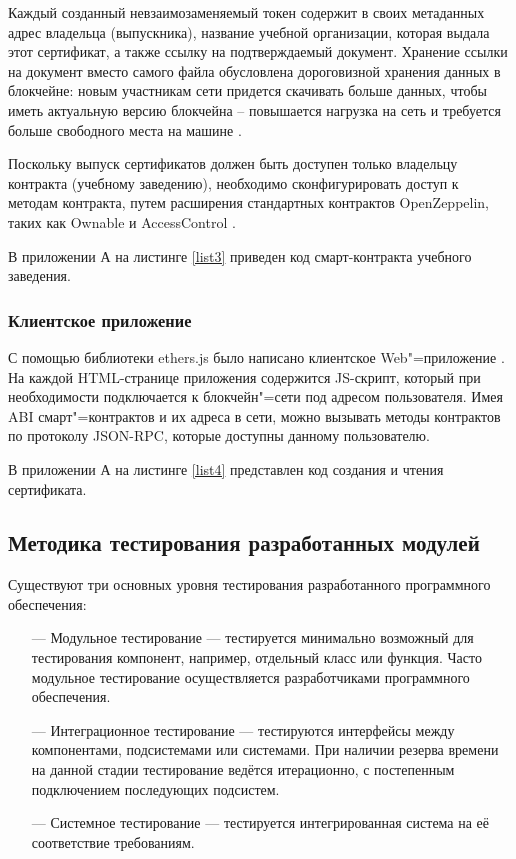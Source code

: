 Каждый созданный невзаимозаменяемый токен содержит в своих метаданных адрес владельца (выпускника), название учебной организации, которая выдала этот сертификат, а также ссылку на подтверждаемый документ. Хранение ссылки на документ вместо самого файла обусловлена дороговизной хранения данных в блокчейне: новым участникам сети придется скачивать больше данных, чтобы иметь актуальную версию блокчейна -- повышается нагрузка на сеть и требуется больше свободного места на машине \cite{ru-bchain4}.

Поскольку выпуск сертификатов должен быть доступен только владельцу контракта (учебному заведению), необходимо сконфигурировать доступ к методам контракта, путем расширения стандартных контрактов OpenZeppelin, таких как Ownable и AccessControl \cite{openzeppelin}.

В приложении А на листинге \ref{list3} приведен код смарт-контракта учебного заведения.




\subsubsection{Клиентское приложение}

С помощью библиотеки ethers.js было написано клиентское Web"=приложение \cite{ethersjs}. На каждой HTML-странице приложения содержится JS-скрипт, который при необходимости подключается к блокчейн"=сети под адресом пользователя. Имея ABI смарт"=контрактов и их адреса в сети, можно вызывать методы контрактов по протоколу JSON-RPC, которые доступны данному пользователю.

В приложении А на листинге \ref{list4} представлен код создания и чтения сертификата.






\subsection{Методика тестирования разработанных модулей}

Существуют три основных уровня тестирования разработанного
программного обеспечения:
\begin{itemize}[leftmargin=1.6\parindent]
	\item[---] Модульное тестирование — тестируется минимально возможный для тестирования компонент, например, отдельный класс или функция. Часто модульное тестирование осуществляется разработчиками программного обеспечения.
	\item[---] Интеграционное тестирование — тестируются интерфейсы между компонентами, подсистемами или системами. При наличии резерва времени на данной стадии тестирование ведётся итерационно, с постепенным подключением последующих подсистем.
	\item[---] Системное тестирование — тестируется интегрированная система на её соответствие требованиям.
\end{itemize}


